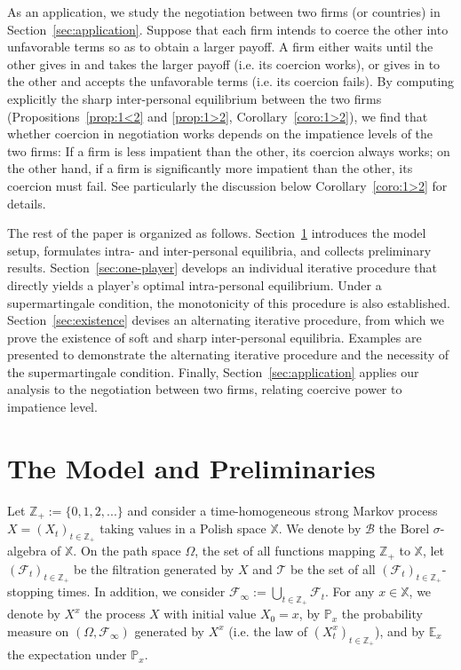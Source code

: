 \documentclass[11pt,reqno]{article}
\numberwithin{equation}{section}
\renewcommand{\P}{\mathbb{P}}
\newcommand{\E}{\mathbb{E}}
\newcommand{\F}{\mathcal{F}}
\newcommand{\X}{\mathbb{X}}
\newcommand{\B}{\mathcal{B}}
\newcommand{\Z}{\mathbb{Z}}
\newcommand{\T}{\mathcal{T}}
\begin{document}
As an application, we study the negotiation between two firms (or countries) in Section~\ref{sec:application}. Suppose that each firm intends to coerce the other into unfavorable terms so as to obtain a larger payoff. A firm either waits until the other gives in and takes the larger payoff (i.e. its coercion works), or gives in to the other and accepts the unfavorable terms (i.e. its coercion fails). By computing explicitly the sharp inter-personal equilibrium between the two firms (Propositions~\ref{prop:1<2} and \ref{prop:1>2}, Corollary~\ref{coro:1>2}), we find that whether coercion in negotiation works depends on the impatience levels of the two firms: If a firm is less impatient than the other, its coercion always works; on the other hand, if a firm is significantly more impatient than the other, its coercion must fail. See particularly the discussion below Corollary~\ref{coro:1>2} for details. 


The rest of the paper is organized as follows. Section~\ref{sec:model} introduces the model setup, formulates intra- and inter-personal equilibria, and collects preliminary results. Section~\ref{sec:one-player} develops an individual iterative procedure that directly yields a player's optimal intra-personal equilibrium. Under a supermartingale condition, the monotonicity of this procedure is also established. Section~\ref{sec:existence} devises an alternating iterative procedure, from which we prove the existence of soft and sharp inter-personal equilibria. Examples are presented to demonstrate the alternating iterative procedure and the necessity of the supermartingale condition. Finally, Section~\ref{sec:application} applies our analysis to the negotiation between two firms, relating coercive power to impatience level.














\section{The Model and Preliminaries}\label{sec:model}
Let $\Z_+:=\{0,1,2,...\}$ and consider a time-homogeneous strong Markov process $X = (X_t)_{t\in\Z_+}$ taking values in a Polish space $\X$. We denote by $\B$ the Borel $\sigma$-algebra of $\X$. On the path space $\Omega$, the set of all functions mapping $\Z_+$ to $\X$, let $(\F_t)_{t\in\Z_+}$ be the filtration generated by $X$ and $\T$ be the set of all $(\F_t)_{t\in\Z_+}$-stopping times. In addition, we consider $\F_\infty:= \bigcup_{t\in \Z_+}\F_t$. For any $x\in\X$, we denote by $X^x$ the process $X$ with initial value $X_0=x$, by $\P_x$ the probability measure on $(\Omega,\F_\infty)$ generated by $X^x$ (i.e. the law of $(X^x_t)_{t\in\Z_+}$), and by $\E_x$ the expectation under $\P_x$. 
\end{document}
